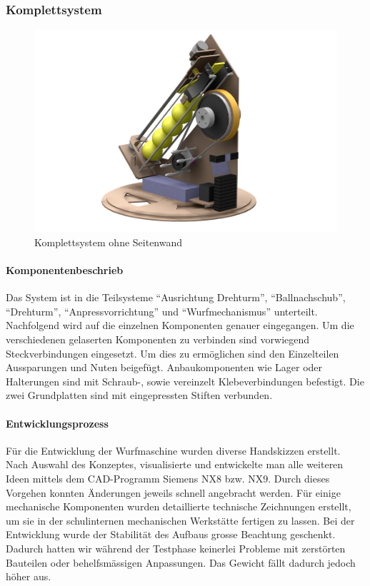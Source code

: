 \subsubsection{Komplettsystem}
\begin{figure}[h!]
	\centering
	\includegraphics[width=\linewidth]{../../fig/Render_Komplettsystem_5}
	\caption{Komplettsystem ohne Seitenwand}
	\label{fig:Komplettsystem}
\end{figure}
\paragraph{Komponentenbeschrieb}
Das System ist in die Teilsysteme "`Ausrichtung Drehturm"', "`Ballnachschub"', "`Drehturm"', "`Anpressvorrichtung"' und "`Wurfmechanismus"' unterteilt. Nachfolgend wird auf die einzelnen Komponenten genauer eingegangen. Um die verschiedenen gelaserten Komponenten zu verbinden sind vorwiegend Steckverbindungen eingesetzt. Um dies zu ermöglichen sind den Einzelteilen Aussparungen und Nuten beigefügt. Anbaukomponenten wie Lager oder Halterungen sind mit Schraub-, sowie vereinzelt Klebeverbindungen befestigt. Die zwei Grundplatten sind mit eingepressten Stiften verbunden.

\paragraph{Entwicklungsprozess}
Für die Entwicklung der Wurfmaschine wurden diverse Handskizzen erstellt. Nach Auswahl des Konzeptes, visualisierte und entwickelte man alle weiteren Ideen mittels dem CAD-Programm Siemens NX8 bzw. NX9. Durch dieses Vorgehen konnten Änderungen jeweils schnell angebracht werden. Für einige mechanische Komponenten wurden detaillierte technische Zeichnungen erstellt, um sie in der schulinternen mechanischen Werkstätte fertigen zu lassen. Bei der Entwicklung wurde der Stabilität des Aufbaus grosse Beachtung geschenkt. Dadurch hatten wir während der Testphase keinerlei Probleme mit zerstörten Bauteilen oder behelfsmässigen Anpassungen. Das Gewicht fällt dadurch jedoch höher aus. 